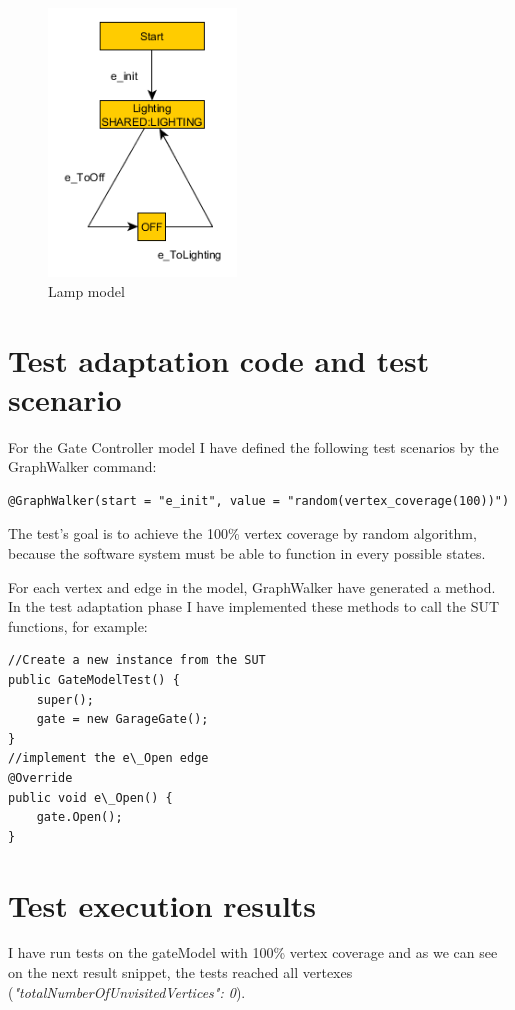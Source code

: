 \begin{figure}[!ht]
	\centering
	\includegraphics[width=50mm, keepaspectratio]{figures/LightingModel.png}
	\caption{Lamp model}
	\label{fig:LampModel}
\end{figure}

\section{Test adaptation code and test scenario}
For the Gate Controller model I have defined the following test scenarios by the GraphWalker command:
\begin{lstlisting}
@GraphWalker(start = "e_init", value = "random(vertex_coverage(100))")
\end{lstlisting}

The test's goal is to achieve the 100\% vertex coverage by random algorithm, because the software system must be able to function in every possible states.

For each vertex and edge in the model, GraphWalker have generated a method. In the test adaptation phase I have implemented these methods to call the SUT functions, for example:

\begin{lstlisting}
//Create a new instance from the SUT
public GateModelTest() {
	super();
	gate = new GarageGate(); 
}
//implement the e\_Open edge
@Override
public void e\_Open() {
	gate.Open();
}
\end{lstlisting}

\section{Test execution results}
I have run tests on the gateModel with 100\% vertex coverage and as we can see on the next result snippet, the tests reached all vertexes (\textit{"totalNumberOfUnvisitedVertices": 0}).

